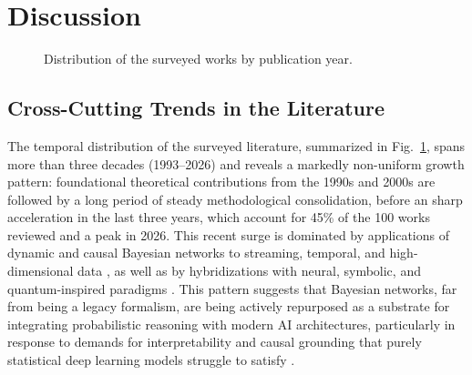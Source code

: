 \section{Discussion}\label{sec:discussion}
\begin{figure}[!t]
\centering
{}
\caption{Distribution of the surveyed works by publication year.}
\label{fig:years}
\end{figure}
\subsection{Cross-Cutting Trends in the Literature}
The temporal distribution of the surveyed literature, summarized in Fig.~\ref{fig:years}, spans more than three decades (1993--2026) and reveals a markedly non-uniform growth pattern: foundational theoretical contributions from the 1990s and 2000s \cite{dagum1993approximating,zhang1996exploiting,tsamardinos2006max} are followed by a long period of steady methodological consolidation, before an sharp acceleration in the last three years, which account for 45\% of the 100 works reviewed and a peak in 2026. This recent surge is dominated by applications of dynamic and causal Bayesian networks to streaming, temporal, and high-dimensional data \cite{zhang2026causal,zhang2026causalb,zhang2026causalc,zhang2026causalk,zhang2026causall,zhang2026causalr,zhang2026causals}, as well as by hybridizations with neural, symbolic, and quantum-inspired paradigms \cite{zhang2026causalo,zhang2026adaptive,zhang2026quantum,zhang2026neuro}. This pattern suggests that Bayesian networks, far from being a legacy formalism, are being actively repurposed as a substrate for integrating probabilistic reasoning with modern AI architectures, particularly in response to demands for interpretability and causal grounding that purely statistical deep learning models struggle to satisfy \cite{gao2026bayesian,geetha2023understanding,revista2026network}.

